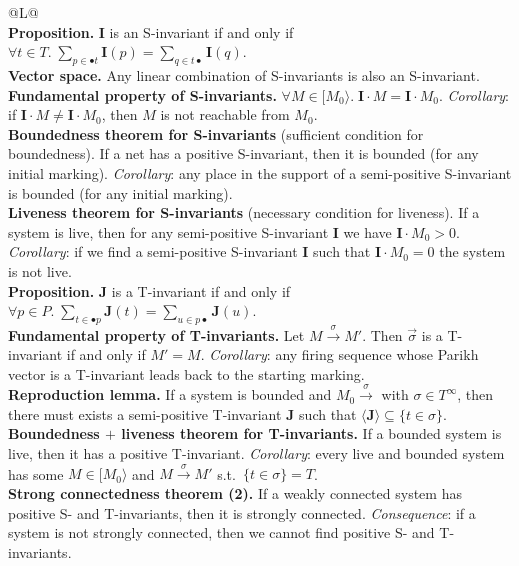 \bigskip
\begin{tabularx}{\linewidth}{@{}L@{}}
\toprule
{}  \\
\midrule
\textbf{Proposition.} $\mathbf{I}$ is an S-invariant if and only if $\forall t \in T.\; \sum_{p \in \bullet t} \mathbf{I}(p) = \sum_{q \in t\bullet} \mathbf{I}(q)$. \\
\midrule
\textbf{Vector space.} Any linear combination of S-invariants is also an S-invariant. \\
\midrule
\textbf{Fundamental property of S-invariants.} $\forall M \in [M_0\rangle.\; \mathbf{I} \cdot M = \mathbf{I} \cdot M_0$. \emph{Corollary}: if $\mathbf{I} \cdot M \neq \mathbf{I} \cdot M_0$, then $M$ is not reachable from $M_0$. \\
\midrule
\textbf{Boundedness theorem for S-invariants} (sufficient condition for boundedness). If a net has a positive S-invariant, then it is bounded (for any initial marking). \emph{Corollary}: any place in the support of a semi-positive S-invariant is bounded (for any initial marking). \\
\midrule
\textbf{Liveness theorem for S-invariants} (necessary condition for liveness). If a system is live, then for any semi-positive S-invariant $\mathbf{I}$ we have $\mathbf{I} \cdot M_0 > 0$. \emph{Corollary}: if we find a semi-positive S-invariant $\mathbf{I}$ such that $\mathbf{I} \cdot M_0 = 0$ the system is not live. \\
\midrule
\textbf{Proposition.} $\mathbf{J}$ is a T-invariant if and only if $\forall p \in P.\; \sum_{t \in \bullet p} \mathbf{J}(t) = \sum_{u \in p\bullet} \mathbf{J}(u)$. \\
\midrule
\textbf{Fundamental property of T-invariants.} Let $M \xrightarrow{\sigma} M'$. Then $\vec\sigma$ is a T-invariant if and only if $M' = M$. \emph{Corollary}: any firing sequence whose Parikh vector is a T-invariant leads back to the starting marking. \\
\midrule
\textbf{Reproduction lemma.} If a system is bounded and $M_0 \xrightarrow{\sigma}$ with $\sigma \in T^\infty$, then there must exists a semi-positive T-invariant $\mathbf{J}$ such that $\langle \mathbf{J} \rangle \subseteq \{t \in \sigma\}$. \\
\midrule
\textbf{Boundedness $+$ liveness theorem for T-invariants.} If a bounded system is live, then it has a positive T-invariant. \emph{Corollary}: every live and bounded system has some $M \in [M_0\rangle$ and $M \xrightarrow{\sigma} M'$ s.t.\ $\{t \in \sigma\} = T$. \\
\midrule
\textbf{Strong connectedness theorem (2).} If a weakly connected system has positive S- and T-invariants, then it is strongly connected. \emph{Consequence}: if a system is not strongly connected, then we cannot find positive S- and T-invariants. \\
\bottomrule
\end{tabularx}

